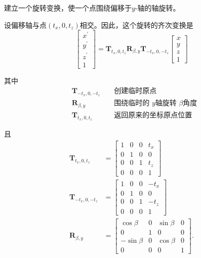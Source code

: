 \begin{example}
    建立一个旋转变换，使一个点围绕偏移于$y$-轴的轴旋转。
    
    设偏移轴与点$\left(t_{x}, 0, t_{z}\right)$相交。因此，这个旋转的齐次变换是
    $$
    \left[\begin{array}{c}
    x^{\prime} \\
    y^{\prime} \\
    z^{\prime} \\
    1
    \end{array}\right]=\mathbf{T}_{t_{x}, 0, t_{z}} \mathbf{R}_{\beta, y} \mathbf{T}_{-t_{x}, 0,-t_{z}}\left[\begin{array}{c}
    x \\
    y \\
    z \\
    1
    \end{array}\right]
    $$
    
    其中
    $$
    \begin{aligned}
    & \mathbf{T}_{-t_{x}, 0,-t_{z}} && \text { 创建临时原点 } \\
    & \mathbf{R}_{\beta, y} && \text { 围绕临时的 } y \text {轴旋转 }\beta \text{角度} \\
    & \mathbf{T}_{t_{x}, 0, t_{z}} && \text { 返回原来的坐标原点位置 }
    \end{aligned}
    $$
    
    且
    $$
    \begin{aligned}
    \mathbf{T}_{t_{x}, 0, t_{z}} & =\left[\begin{array}{llll}
    1 & 0 & 0 & t_{x} \\
    0 & 1 & 0 & 0 \\
    0 & 0 & 1 & t_{z} \\
    0 & 0 & 0 & 1
    \end{array}\right] \\
    \mathbf{T}_{-t_{x}, 0,-t_{z}} & =\left[\begin{array}{cccc}
    1 & 0 & 0 & -t_{x} \\
    0 & 1 & 0 & 0 \\
    0 & 0 & 1 & -t_{z} \\
    0 & 0 & 0 & 1
    \end{array}\right] \\
    \mathbf{R}_{\beta, y} & =\left[\begin{array}{cccc}
    \cos \beta & 0 & \sin \beta & 0 \\
    0 & 1 & 0 & 0 \\
    -\sin \beta & 0 & \cos \beta & 0 \\
    0 & 0 & 0 & 1
    \end{array}\right] .
    \end{aligned}
    $$
    

\end{example}
